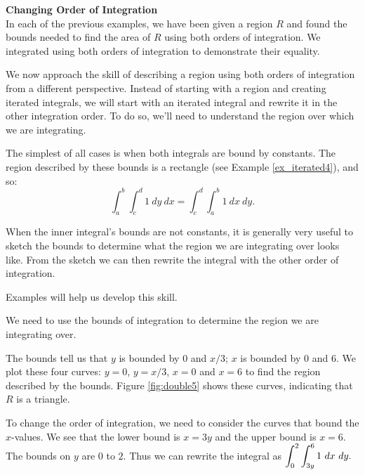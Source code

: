 \noindent \textbf{\large Changing Order of Integration}\\

In each of the previous examples, we have been given a region $R$ and found the bounds needed to find the area of $R$ using both orders of integration. We integrated using both orders of integration to demonstrate their equality.

We now approach the skill of describing a region using both orders of integration from a different perspective. Instead of starting with a region and creating iterated integrals, we will start with an iterated integral and rewrite it in the other integration order. To do so, we'll need to understand the region over which we are integrating.

The simplest of all cases is when both integrals are bound by constants. The region described by these bounds is a rectangle (see Example \ref{ex_iterated4}), and so:
$$\int_a^b\int_c^d 1\ dy\ dx = \int_c^d\int_a^b1\ dx\ dy.$$

When the inner integral's bounds are not constants, it is generally very useful to sketch the bounds to determine what the region we are integrating over looks like. From the sketch we can then rewrite the integral with the other order of integration.

Examples will help us develop this skill.\\

{We need to use the bounds of integration to determine the region we are integrating over. %

The bounds tell us that $y$ is bounded by $0$ and $x/3$; $x$ is bounded by 0 and 6. We plot these four curves: $y=0$, $y=x/3$, $x=0$ and $x=6$ to find the region described by the bounds. Figure \ref{fig:double5} shows these curves, indicating that $R$ is a triangle.
\enlargethispage{\baselineskip}

To change the order of integration, we need to consider the curves that bound the $x$-values. We see that the lower bound is $x=3y$ and the upper bound is $x=6$. The bounds on $y$ are $0$ to $2$. Thus we can rewrite the integral as 
$\displaystyle \int_0^2\int_{3y}^6 1\ dx \ dy.$
\vskip 0pt
}\\

